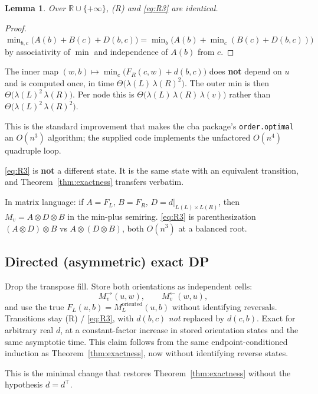 \documentclass[11pt]{article}
\theoremstyle{plain}
\newtheorem{lemma}[theorem]{Lemma}
\newcommand{\R}{\mathbb{R}}
\begin{document}
\begin{lemma}\label{lem:R3eq}
Over \(\R\cup\{+\infty\}\), (R) and \eqref{eq:R3} are identical.
\end{lemma}

\begin{proof}
\(\min_{b,c} \bigl(A(b) + B(c) + D(b,c)\bigr)
= \min_b \bigl(A(b) + \min_c(B(c)+D(b,c))\bigr)\)
by associativity of \(\min\) and independence of \(A(b)\) from \(c\).
\end{proof}

The inner map \((w,b) \mapsto \min_c\bigl(F_R(c,w)+d(b,c)\bigr)\) does
\textbf{not} depend on \(u\) and is computed once, in time
\(\Theta\bigl(\lambda(L)\,\lambda(R)^2\bigr)\). The outer min is then
\(\Theta\bigl(\lambda(L)^2\,\lambda(R)\bigr)\). Per node this is
\(\Theta\bigl(\lambda(L)\,\lambda(R)\,\lambda(v)\bigr)\) rather than
\(\Theta\bigl(\lambda(L)^2\,\lambda(R)^2\bigr)\).

This is the standard improvement that makes the cba package's
\texttt{order.optimal} an \(O(n^3)\) algorithm; the supplied code implements
the unfactored \(O(n^4)\) quadruple loop.

\eqref{eq:R3} is \textbf{not} a different state. It is the same state with an
equivalent transition, and Theorem~\ref{thm:exactness} transfers verbatim.

In matrix language: if \(A = F_L\), \(B = F_R\), \(D = d|_{L(L)\times L(R)}\),
then \(M_v = A \otimes D \otimes B\) in the min-plus semiring. \eqref{eq:R3} is
parenthesization \((A \otimes D) \otimes B\) vs \(A \otimes (D \otimes B)\),
both \(O(n^3)\) at a balanced root.

\subsection{Directed (asymmetric) exact DP}

Drop the transpose fill. Store both orientations as independent cells:
\[
M_v^{\rightarrow}(u,w),\qquad
M_v^{\leftarrow}(w,u),
\]
and use the true \(F_L(u,b) = M_L^{\text{oriented}}(u,b)\) without identifying
reversals. Transitions stay (R) / \eqref{eq:R3}, with \(d(b,c)\) \emph{not}
replaced by \(d(c,b)\). Exact for arbitrary real \(d\), at a constant-factor
increase in stored orientation states and the same asymptotic time. This claim
follows from the same endpoint-conditioned induction as
Theorem~\ref{thm:exactness}, now without identifying reverse states.

This is the minimal change that restores Theorem~\ref{thm:exactness} without
the hypothesis \(d = d^\top\).
\end{document}
